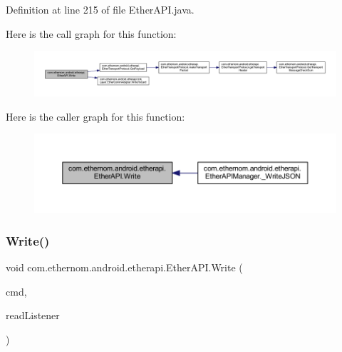 Definition at line 215 of file Ether\+A\+P\+I.\+java.

Here is the call graph for this function\+:\nopagebreak
\begin{figure}[H]
\begin{center}
\leavevmode
\includegraphics[width=350pt]{classcom_1_1ethernom_1_1android_1_1etherapi_1_1_ether_a_p_i_a00dfeb101d51c8b28b2f11d7bdf5f84c_cgraph}
\end{center}
\end{figure}
Here is the caller graph for this function\+:\nopagebreak
\begin{figure}[H]
\begin{center}
\leavevmode
\includegraphics[width=350pt]{classcom_1_1ethernom_1_1android_1_1etherapi_1_1_ether_a_p_i_a00dfeb101d51c8b28b2f11d7bdf5f84c_icgraph}
\end{center}
\end{figure}
\mbox{\label{classcom_1_1ethernom_1_1android_1_1etherapi_1_1_ether_a_p_i_aa812a2cc15c8b51c541b128b773c864f}} 
\subsubsection{\texorpdfstring{Write()}{Write()}\hspace{0.1cm}{\footnotesize\ttfamily [2/6]}}
{\footnotesize\ttfamily void com.\+ethernom.\+android.\+etherapi.\+Ether\+A\+P\+I.\+Write (\begin{DoxyParamCaption}\item[{byte}]{cmd,  }\item[{final \mbox{\hyperlink{interfacecom_1_1ethernom_1_1android_1_1etherapi_1_1_read_listener}{Read\+Listener}}}]{read\+Listener }\end{DoxyParamCaption})}



